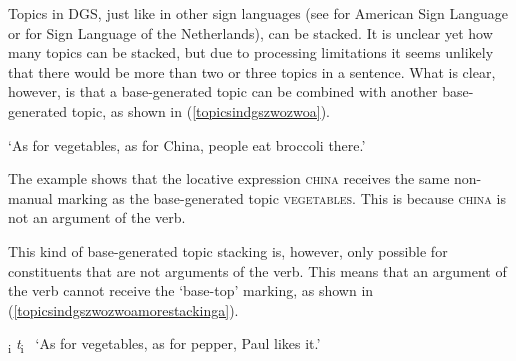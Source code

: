 Topics in DGS, just like in other sign languages (see \citealt{aarons1994aspects} for American Sign Language or \citealt{pfau2008topics} for Sign Language of the Netherlands), can be stacked. It is unclear yet how many topics can be stacked, but due to processing limitations it seems unlikely that there would be more than two or three topics in a sentence. What is clear, however, is that a base-generated topic can be combined with another base-generated topic, as shown in (\ref{topicsindgszwozwoa}).

\begin{exe}
\ex {}  
\glt `As for vegetables, as for China, people eat broccoli there.' \label{topicsindgszwozwoa}
\end{exe}

\noindent The example shows that the locative expression \textsc{china} receives the same non-manual marking as the base-generated topic \textsc{vegetables}. This is because \textsc{china} is not an argument of the verb. %

This kind of base-generated topic stacking is, however, only possible for constituents that are not arguments of the verb. This means that an argument of the verb cannot receive the `base-top' marking, as shown in (\ref{topicsindgszwozwoamorestackinga}).

\begin{exe}
\ex * \textsubscript{\textup{i}} \textit{t}\textsubscript{i} 
\glt \textcolor{white}{*}`As for vegetables, as for pepper, Paul likes it.' \label{topicsindgszwozwoamorestackinga}
\end{exe}

